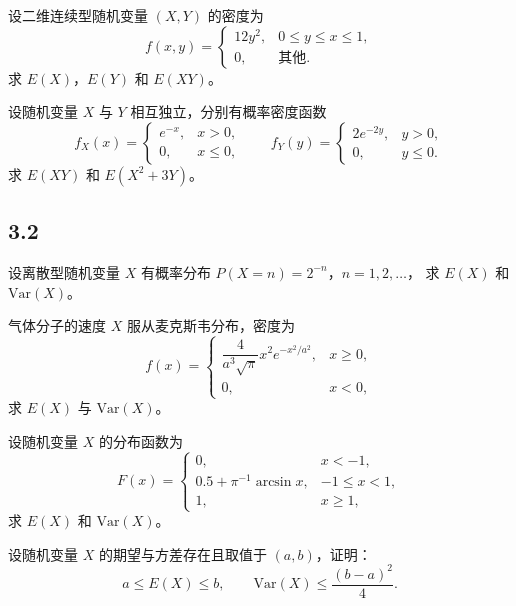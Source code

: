 \begin{homework}[3.20]
设二维连续型随机变量 $(X,Y)$ 的密度为
\[
f(x,y)=
\begin{cases}
12y^2,& 0\le y\le x\le1,\\[4pt]
0,&\text{其他}.
\end{cases}
\]
求 $E(X)$，$E(Y)$ 和 $E(XY)$。
\end{homework}

\begin{homework}[3.21]
设随机变量 $X$ 与 $Y$ 相互独立，分别有概率密度函数
\[
f_X(x)=
\begin{cases}
e^{-x}, & x>0,\\
0, & x\le0,
\end{cases}
\qquad
f_Y(y)=
\begin{cases}
2e^{-2y}, & y>0,\\
0, & y\le0.
\end{cases}
\]
求 $E(XY)$ 和 $E(X^2+3Y)$。
\end{homework}
\subsection*{3.2}
\begin{homework}[3.5]
设离散型随机变量 $X$ 有概率分布 $P(X=n)=2^{-n}$，$n=1,2,\ldots$，
求 $E(X)$ 和 $\mathrm{Var}(X)$。
\end{homework}

\begin{homework}[3.12]
气体分子的速度 $X$ 服从麦克斯韦分布，密度为
\[
f(x)=
\begin{cases}
\dfrac{4}{a^3\sqrt{\pi}}x^2 e^{-x^2/a^2}, & x\ge0,\\
0,& x<0,
\end{cases}
\]
求 $E(X)$ 与 $\mathrm{Var}(X)$。
\end{homework}

\begin{homework}[3.14]
设随机变量 $X$ 的分布函数为
\[
F(x)=
\begin{cases}
0,& x<-1,\\
0.5+\pi^{-1}\arcsin x,& -1\le x<1,\\
1,& x\ge1,
\end{cases}
\]
求 $E(X)$ 和 $\mathrm{Var}(X)$。
\end{homework}

\begin{homework}[3.16]
设随机变量 $X$ 的期望与方差存在且取值于 $(a,b)$，证明：
\[
a\le E(X)\le b,\qquad 
\mathrm{Var}(X)\le \frac{(b-a)^2}{4}.
\]
\end{homework}

